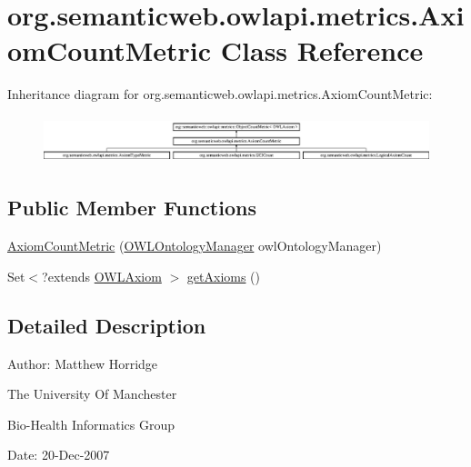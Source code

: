\hypertarget{classorg_1_1semanticweb_1_1owlapi_1_1metrics_1_1_axiom_count_metric}{\section{org.\-semanticweb.\-owlapi.\-metrics.\-Axiom\-Count\-Metric Class Reference}
\label{classorg_1_1semanticweb_1_1owlapi_1_1metrics_1_1_axiom_count_metric}
}
Inheritance diagram for org.\-semanticweb.\-owlapi.\-metrics.\-Axiom\-Count\-Metric\-:\begin{figure}[H]
\begin{center}
\leavevmode
\includegraphics[height=1.389578cm]{classorg_1_1semanticweb_1_1owlapi_1_1metrics_1_1_axiom_count_metric}
\end{center}
\end{figure}
\subsection*{Public Member Functions}
\begin{DoxyCompactItemize}
\item 
\hyperlink{classorg_1_1semanticweb_1_1owlapi_1_1metrics_1_1_axiom_count_metric_a3beefd3d8eee2fbc6eb6d725ddfc6f23}{Axiom\-Count\-Metric} (\hyperlink{interfaceorg_1_1semanticweb_1_1owlapi_1_1model_1_1_o_w_l_ontology_manager}{O\-W\-L\-Ontology\-Manager} owl\-Ontology\-Manager)
\item 
Set$<$?extends \hyperlink{interfaceorg_1_1semanticweb_1_1owlapi_1_1model_1_1_o_w_l_axiom}{O\-W\-L\-Axiom} $>$ \hyperlink{classorg_1_1semanticweb_1_1owlapi_1_1metrics_1_1_axiom_count_metric_ae65816c4a4d0d52e8ae90a3b85c840f4}{get\-Axioms} ()
\end{DoxyCompactItemize}


\subsection{Detailed Description}
Author\-: Matthew Horridge\par
 The University Of Manchester\par
 Bio-\/\-Health Informatics Group\par
 Date\-: 20-\/\-Dec-\/2007\par
\par
 

